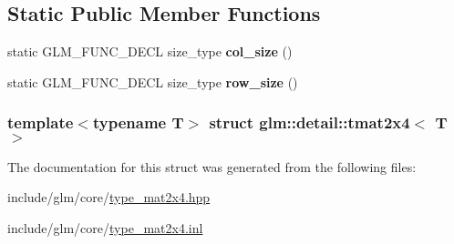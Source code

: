 \subsection*{\-Static \-Public \-Member \-Functions}
\begin{DoxyCompactItemize}
\item 
\hypertarget{structglm_1_1detail_1_1tmat2x4_a5ed23bf77b036f85b30c034fb168d967}{static \-G\-L\-M\-\_\-\-F\-U\-N\-C\-\_\-\-D\-E\-C\-L size\-\_\-type {\bfseries col\-\_\-size} ()}\label{structglm_1_1detail_1_1tmat2x4_a5ed23bf77b036f85b30c034fb168d967}

\item 
\hypertarget{structglm_1_1detail_1_1tmat2x4_a58e10cf43d601b15d3e76b310d3c6d86}{static \-G\-L\-M\-\_\-\-F\-U\-N\-C\-\_\-\-D\-E\-C\-L size\-\_\-type {\bfseries row\-\_\-size} ()}\label{structglm_1_1detail_1_1tmat2x4_a58e10cf43d601b15d3e76b310d3c6d86}

\end{DoxyCompactItemize}
\subsubsection*{template$<$typename \-T$>$ struct glm\-::detail\-::tmat2x4$<$ T $>$}



\-The documentation for this struct was generated from the following files\-:\begin{DoxyCompactItemize}
\item 
include/glm/core/\hyperlink{type__mat2x4_8hpp}{type\-\_\-mat2x4.\-hpp}\item 
include/glm/core/\hyperlink{type__mat2x4_8inl}{type\-\_\-mat2x4.\-inl}\end{DoxyCompactItemize}
